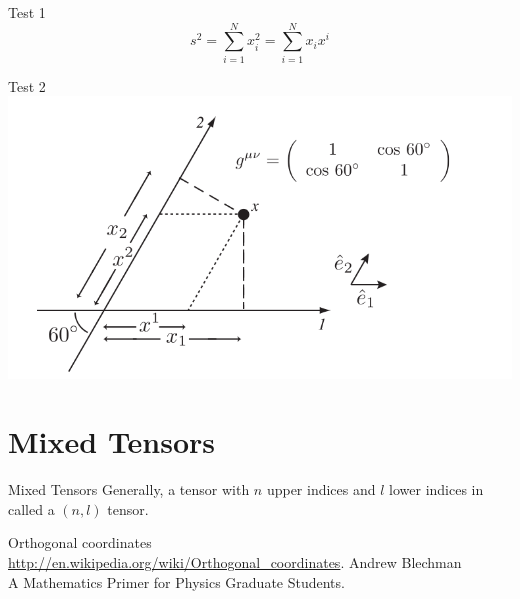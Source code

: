 \documentclass{beamer}
\begin{document}
\begin{frame}{Test 1}
	\[ s^2 = \sum_{i=1}^N x_i^2 = \sum_{i=1}^N x_i x^i \]

\end{frame}
\begin{frame}{Test 2}
	\includegraphics[scale=0.45]{ContravariantCovariant.png}
\end{frame}

\section{Mixed Tensors}
\begin{frame}{Mixed Tensors}
	Generally, a tensor with $n$ upper indices and $l$ lower indices in called a $(n,l)$ tensor.

\end{frame}

\begin{thebibliography}{9}
		Orthogonal coordinates \\
		\url{http://en.wikipedia.org/wiki/Orthogonal_coordinates}.
		Andrew Blechman \\
		A Mathematics Primer for Physics Graduate Students.
\end{thebibliography}
\end{document}
